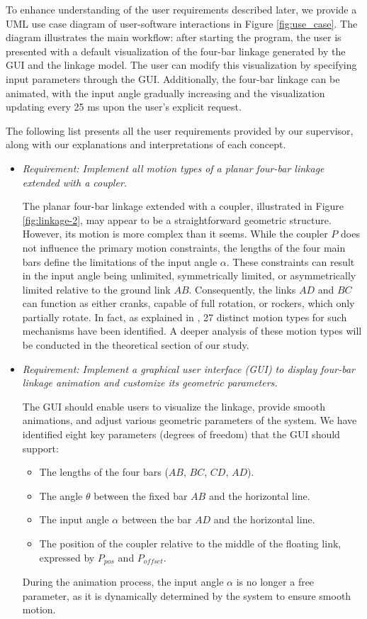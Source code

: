 \documentclass{article}
\begin{document}
To enhance understanding of the user requirements described later, we provide a UML use case diagram of user-software interactions in Figure \ref{fig:use_case}. The diagram illustrates the main workflow: after starting the program, the user is presented with a default visualization of the four-bar linkage generated by the GUI and the linkage model. The user can modify this visualization by specifying input parameters through the GUI. Additionally, the four-bar linkage can be animated, with the input angle gradually increasing and the visualization updating every 25 ms upon the user’s explicit request.

The following list presents all the user requirements provided by our supervisor, along with our explanations and interpretations of each concept.

\begin{itemize}
	\item \textit{Requirement: Implement all motion types of a planar four-bar linkage extended with a coupler.}
	
	The planar four-bar linkage extended with a coupler, illustrated in Figure \ref{fig:linkage-2}, may appear to be a straightforward geometric structure. However, its motion is more complex than it seems. While the coupler $P$ does not influence the primary motion constraints, the lengths of the four main bars define the limitations of the input angle $\alpha$. These constraints can result in the input angle being unlimited, symmetrically limited, or asymmetrically limited relative to the ground link $AB$. Consequently, the links $AD$ and $BC$ can function as either cranks, capable of full rotation, or rockers, which only partially rotate. In fact, as explained in \cite{inproceedings}, 27 distinct motion types for such mechanisms have been identified. A deeper analysis of these motion types will be conducted in the theoretical section of our study.
	
	\item \textit{Requirement: Implement a graphical user interface (GUI) to display four-bar linkage animation and customize its geometric parameters.}
	
	The GUI should enable users to visualize the linkage, provide smooth animations, and adjust various geometric parameters of the system. We have identified eight key parameters (degrees of freedom) that the GUI should support:
	\begin{itemize}
		\item The lengths of the four bars ($AB$, $BC$, $CD$, $AD$).
		\item The angle $\theta$ between the fixed bar $AB$ and the horizontal line.
		\item The input angle $\alpha$ between the bar $AD$ and the horizontal line.
		\item The position of the coupler relative to the middle of the floating link, expressed by $P_{pos}$ and $P_{offset}$.
	\end{itemize}
	During the animation process, the input angle $\alpha$ is no longer a free parameter, as it is dynamically determined by the system to ensure smooth motion.
	

\end{itemize}
\end{document}
